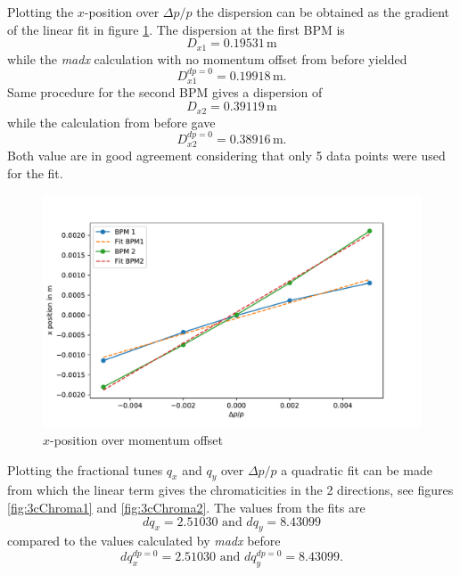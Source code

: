 Plotting the $x$-position over $\Delta p/p$ the dispersion can be obtained as the gradient of the linear fit in figure \ref{fig:3cDispersion}.
The dispersion at the first BPM is $$D_{x1}=0.19531\,\mathrm{m}$$ while the \textit{madx} calculation with no momentum offset from before yielded $$D_{x1}^{dp=0}=0.19918\,\mathrm{m}.$$ Same procedure for the second BPM gives a dispersion of $$D_{x2}=0.39119\,\mathrm{m}$$ while the calculation from before gave $$D_{x2}^{dp=0}=0.38916\,\mathrm{m}.$$ Both value are in good agreement considering that only 5 data points were used for the fit.
\begin{figure}[tbp]
    \centering
    \includegraphics[width=0.8\linewidth]{../../part3/3c_dispersion.pdf}
    \caption{$x$-position over momentum offset}
    \label{fig:3cDispersion}
\end{figure}
\par
Plotting the fractional tunes $q_x$ and $q_y$ over $\Delta p/p$ a quadratic fit can be made from which the linear term gives the chromaticities in the 2 directions, see figures \ref{fig:3cChroma1} and \ref{fig:3cChroma2}.
The values from the fits are $$dq_x=2.51030\text{ and }dq_y=8.43099$$ compared to the values calculated by \textit{madx} before $$dq_x^{dp=0}=2.51030\text{ and }dq_y^{dp=0}=8.43099.$$
